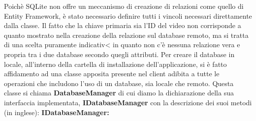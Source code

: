 \documentclass[a4]{book}
\begin{document}
Poichè SQLite non offre un meccanismo di creazione di relazioni come quello di Entity Framework, è stato necessario definire tutti i vincoli necessari direttamente dalla classe. Il fatto che la chiave primaria sia l'ID del video non corrisponde a quanto mostrato nella creazione della relazione sul database remoto, ma si tratta di una scelta puramente indicativ< in quanto non c'è nessuna relazione vera e propria tra i due database secondo quegli attributi. Per creare il database in locale, all'interno della cartella di installazione dell'applicazione, si è fatto affidamento ad una classe apposita presente nel client adibita a tutte le operazioni che includono l'uso di un database, sia locale che remoto. Questa classe si chiama \textbf{DatabaseManager} di cui diamo la dichiarazione della sua interfaccia implementata, \textbf{IDatabaseManager}  con la descrizione dei suoi metodi (in inglese): \newline
\textbf{IDatabaseManager:}
\end{document}
